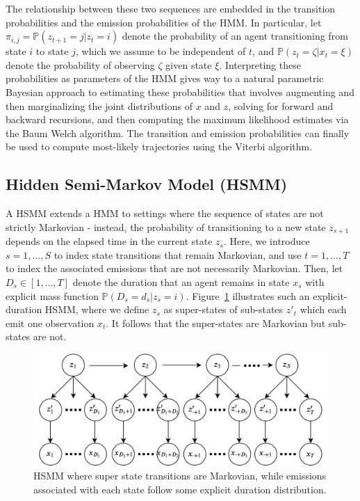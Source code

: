 \documentclass{article}
\begin{document}
The relationship between these two sequences are embedded in the transition probabilities and the emission probabilities of the HMM. In particular, let $\pi_{i,j} = \mathbb{P}(z_{t+1} = j | z_{t} = i)$ denote the probability of an agent transitioning from state $i$ to state $j$, which we assume to be independent of $t$, and $\mathbb{P}(z_t = \zeta | x_t = \xi)$ denote the probability of observing $\zeta$ given state $\xi$. Interpreting these probabilities as parameters of the HMM gives way to a natural parametric Bayesian approach to estimating these probabilities that involves augmenting and then marginalizing the joint distributions of $x$ and $z$, solving for forward and backward recursions, and then computing the maximum likelihood estimates via the Baum Welch algorithm. The transition and emission probabilities can finally be used to compute most-likely trajectories using the Viterbi algorithm.

\subsection{Hidden Semi-Markov Model (HSMM)}
A HSMM extends a HMM to settings where the sequence of states are not strictly Markovian - instead, the probability of transitioning to a new state $z_{s+1}$ depends on the elapsed time in the current state $z_s$. Here, we introduce $s = 1, \dots, S$ to index state transitions that remain Markovian, and use $t= 1, \dots, T$ to index the associated emissions that are not necessarily Markovian. Then, let $D_s \in [1, \dots, T]$ denote the duration that an agent remains in state $x_s$ with explicit mass function $\mathbb{P}(D_s = d_s | z_s = i)$. Figure~\ref{fig:hsmm} illustrates such an explicit-duration HSMM, where we define $z_s$ as super-states of sub-states $z'_{t}$ which each emit one observation $x_{t}$. It follows that the super-states are Markovian but sub-states are not.

\begin{figure}[H]
\centering
\includegraphics[scale=0.10]{images/hsmm2.png}
\caption{HSMM where super state transitions are Markovian, while emissions associated with each state follow some explicit duration distribution.}
\label{fig:hsmm}
\end{figure}
\end{document}
